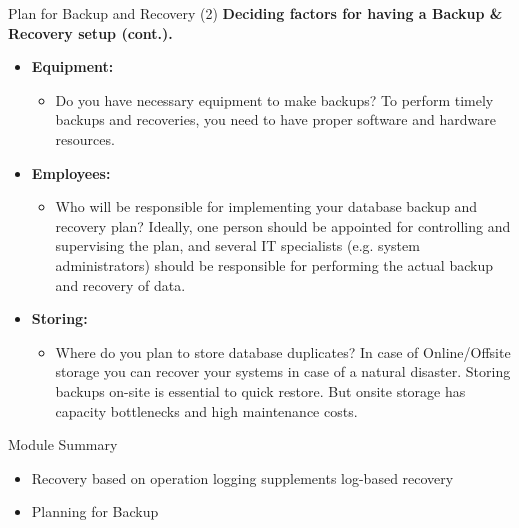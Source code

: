 \documentclass[aspectratio=169, xcolor=dvipsnames]{beamer}
\begin{document}
\begin{frame}{Plan for Backup and Recovery (2)}
    \textbf{Deciding factors for having a Backup \& Recovery setup (cont.).}
    \begin{itemize}[<+->]
        \item \textbf{Equipment:}
        \begin{itemize}
            \item[$\triangleright$] Do you have necessary equipment to make backups? To perform timely backups and recoveries, you need to have proper software and hardware resources.
        \end{itemize}
        \item \textbf{Employees:}
        \begin{itemize}
            \item[$\triangleright$] Who will be responsible for implementing your database backup and recovery plan? Ideally, one person should be appointed for controlling and supervising the plan, and several IT specialists (e.g. system administrators) should be responsible for performing the actual backup and recovery of data.
        \end{itemize}
        \item \textbf{Storing:}
        \begin{itemize}
            \item[$\triangleright$] Where do you plan to store database duplicates? In case of Online/Offsite storage you can recover your systems in case of a natural disaster. Storing backups on-site is essential to quick restore. But onsite storage has capacity bottlenecks and high maintenance costs.
        \end{itemize}
    \end{itemize}
\end{frame}

\begin{frame}{Module Summary}
    \begin{itemize}[<+->]
        \item Recovery based on operation logging supplements log-based recovery
        \item Planning for Backup
    \end{itemize}
    \vspace{2em}
\end{frame}
\end{document}
